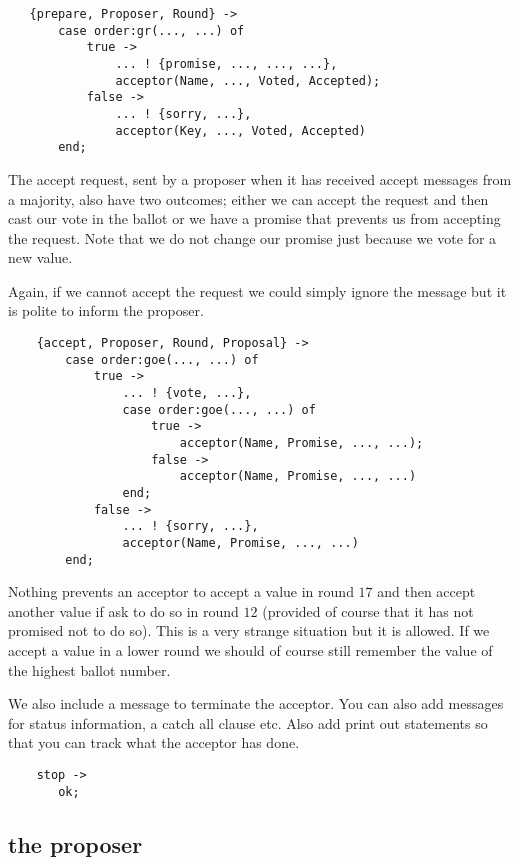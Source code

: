 \documentclass[a4paper,11pt]{article}
\begin{document}
\begin{verbatim}
   {prepare, Proposer, Round} ->
       case order:gr(..., ...) of
           true ->
               ... ! {promise, ..., ..., ...},
               acceptor(Name, ..., Voted, Accepted);
           false ->
               ... ! {sorry, ...},
               acceptor(Key, ..., Voted, Accepted)
       end;
\end{verbatim}


The accept request, sent by a proposer when it has received accept
messages from a majority, also have two outcomes; either we can accept
the request and then cast our vote in the ballot or we have a promise
that prevents us from accepting the request. Note that we do not
change our promise just because we vote for a new value.

Again, if we cannot accept the request we could simply ignore the
message but it is polite to inform the proposer.

\begin{verbatim} 
    {accept, Proposer, Round, Proposal} ->
        case order:goe(..., ...) of
            true ->
                ... ! {vote, ...},
                case order:goe(..., ...) of
                    true ->
                        acceptor(Name, Promise, ..., ...);
                    false ->
                        acceptor(Name, Promise, ..., ...)
                end;                            
            false ->
                ... ! {sorry, ...},
                acceptor(Name, Promise, ..., ...)
        end;
\end{verbatim}

Nothing prevents an acceptor to accept a value in round $17$ and then
accept another value if ask to do so in round $12$ (provided of course
that it has not promised not to do so). This is a very strange
situation but it is allowed. If we accept a value in a lower round we
should of course still remember the value of the highest ballot number.

We also include a message to terminate the acceptor. You can also add
messages for status information, a catch all clause etc. Also add
print out statements so that you can track what the acceptor has done.

\begin{verbatim}
    stop ->
       ok;
\end{verbatim}


\subsection{the proposer}
\end{document}
